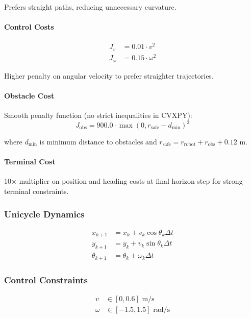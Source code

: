 \documentclass[11pt,a4paper]{article}
\begin{document}
Prefers straight paths, reducing unnecessary curvature.

\paragraph{Control Costs}
\begin{align}
J_v &= 0.01 \cdot v^2 \nonumber \\
J_\omega &= 0.15 \cdot \omega^2 \nonumber
\end{align}

Higher penalty on angular velocity to prefer straighter trajectories.

\paragraph{Obstacle Cost}
Smooth penalty function (no strict inequalities in CVXPY):
\begin{equation}
J_{\text{obs}} = 900.0 \cdot \max(0, r_{\text{safe}} - d_{\text{min}})^2
\end{equation}

where $d_{\text{min}}$ is minimum distance to obstacles and $r_{\text{safe}} = r_{\text{robot}} + r_{\text{obs}} + 0.12$ m.

\paragraph{Terminal Cost}
10× multiplier on position and heading costs at final horizon step for strong terminal constraints.

\subsubsection{Unicycle Dynamics}

\begin{align}
x_{k+1} &= x_k + v_k \cos\theta_k \Delta t \nonumber \\
y_{k+1} &= y_k + v_k \sin\theta_k \Delta t \nonumber \\
\theta_{k+1} &= \theta_k + \omega_k \Delta t \nonumber
\end{align}

\subsubsection{Control Constraints}

\begin{align}
v &\in [0, 0.6] \text{ m/s} \nonumber \\
\omega &\in [-1.5, 1.5] \text{ rad/s} \nonumber
\end{align}
\end{document}
